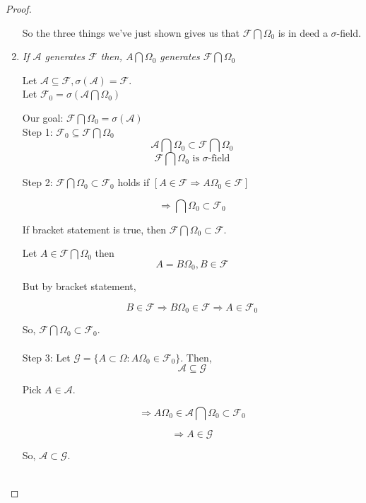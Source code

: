 \documentclass[11pt,fleqn]{book} %
\begin{document}
\begin{proof}
\begin{enumerate}[label = (\roman*)]
		So the three things we've just shown gives us that $\mathcal{F} \bigcap \Omega_0$ is in deed a $\sigma$-field.
					



		\item \textit{If $\mathcal{A}$ generates $\mathcal{F}$ then, $A \bigcap \Omega_0$ generates $\mathcal{F} \bigcap \Omega_0$}

			Let $\mathcal{A} \subseteq \mathcal{F}, \sigma(\mathcal{A}) = \mathcal{F}$.\\
			Let $\mathcal{F}_0 = \sigma(\mathcal{A} \bigcap \Omega_0)$

			Our goal: $\mathcal{F} \bigcap \Omega_0 = \sigma(\mathcal{A})$\\

			Step 1: $\mathcal{F}_0 \subseteq \mathcal{F} \bigcap \Omega_0$\\

				$$\mathcal{A} \bigcap \Omega_0 \subset \mathcal{F} \bigcap \Omega_0$$
				$$\mathcal{F} \bigcap \Omega_0 \text{ is }\sigma\text{-field} $$

			Step 2: $\mathcal{F} \bigcap \Omega_0 \subset \mathcal{F}_0$ holds if $[A \in \mathcal{F} \Rightarrow A \Omega_0 \in \mathcal{F}]$

				$$\Rightarrow \bigcap \Omega_0 \subset \mathcal{F}_0$$

				If bracket statement is true, then $\mathcal{F} \bigcap \Omega_0 \subset \mathcal{F}$.

				Let $A \in \mathcal{F} \bigcap \Omega_0$ then 
				$$A = B \Omega_0, B \in \mathcal{F} $$

				But by bracket statement, 

				$$B \in \mathcal{F} \Rightarrow B\Omega_0 \in \mathcal{F} \Rightarrow A \in \mathcal{F}_0$$

				So, $\mathcal{F} \bigcap \Omega_0 \subset \mathcal{F}_0$.\\
				\\

			Step 3: Let $\mathcal{G} = \{A \subset \Omega: A \Omega_0 \in \mathcal{F}_0 \}$. 
			Then, 
			$$\mathcal{A} \subseteq \mathcal{G} $$

				Pick $A \in \mathcal{A}$.

			
					$$\Rightarrow A\Omega_0 \in \mathcal{A} \bigcap \Omega_0 \subset \mathcal{F}_0$$
			

					$$\Rightarrow A \in \mathcal{G} $$

				So, $\mathcal{A} \subset \mathcal{G}$.\\
				\\


\end{enumerate}
\end{proof}
\end{document}

